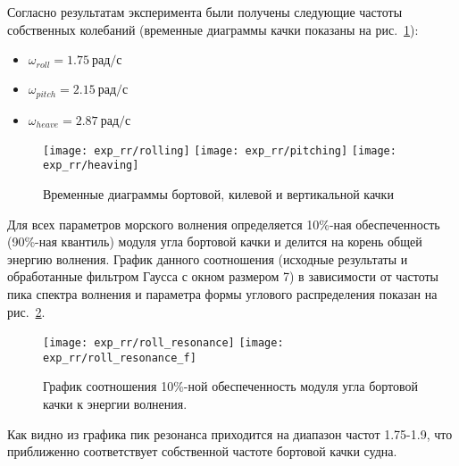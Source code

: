Согласно результатам эксперимента были получены следующие частоты собственных колебаний (временные диаграммы качки показаны на рис.~\ref{exp_rr_rolling}):
\begin{itemize}
	\item	$ \omega_{roll} = 1.75\ \text{рад/с}$
	\item	$ \omega_{pitch} = 2.15\ \text{рад/с}$
	\item	$ \omega_{heave} = 2.87\ \text{рад/с}$
\end{itemize}

\begin{figure}[ht]
	\begin{center}
	\texttt{[image: exp\_rr/rolling]}
	\texttt{[image: exp\_rr/pitching]}
	\texttt{[image: exp\_rr/heaving]}
	\end{center}
	\caption{Временные диаграммы бортовой, килевой и вертикальной качки}
	\label{exp_rr_rolling}
\end{figure}

Для всех параметров морского волнения определяется 10\%-ная обеспеченность (90\%-ная квантиль) модуля угла бортовой качки и делится на корень общей энергию волнения. График данного соотношения (исходные результаты и обработанные фильтром Гаусса с окном размером 7) в зависимости от частоты пика спектра волнения и параметра формы углового распределения показан на рис.~\ref{rr_res}.

\begin{figure}[ht]
	\begin{center}
	\texttt{[image: exp\_rr/roll\_resonance]}
	\texttt{[image: exp\_rr/roll\_resonance\_f]}
	\end{center}
	\caption{График соотношения 10\%-ной обеспеченность модуля угла бортовой качки к энергии волнения.}
	\label{rr_res}
\end{figure}

Как видно из графика пик резонанса приходится на диапазон частот 1.75-1.9, что приближенно соответствует собственной частоте бортовой качки судна.